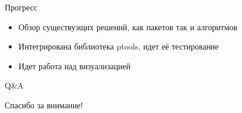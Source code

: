 \documentclass[utf8]{beamer}
\begin{document}
\begin{frame}{Прогресс}
\begin{itemize}
	\item Обзор существуэщих решений, как пакетов так и алгоритмов 
	\item Интегрирована библиотека ptools, идет её тестирование
	\item Идет работа над визуализацией
\end{itemize}
\end{frame}

\begin{frame}{Q\&A}
\begin{center} 
Спасибо за внимание!
\end{center}
\end{frame}
\end{document}
